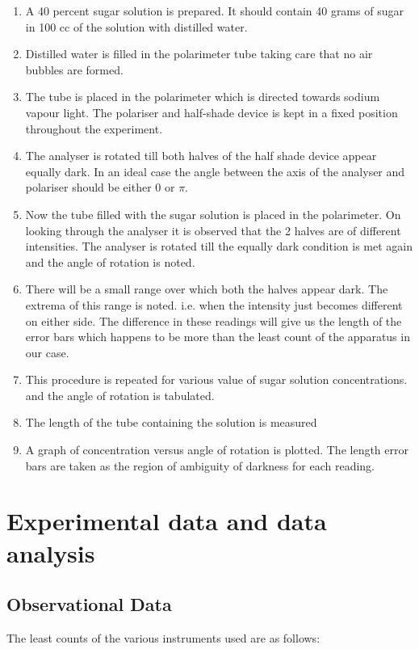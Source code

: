 \documentclass{dkpinto-report}
\begin{document}
\begin{enumerate}
\item A 40 percent sugar solution is prepared. It should contain 40 grams of sugar in 100 cc of the solution with distilled water.
\item Distilled water is filled in the polarimeter tube taking care that no air bubbles are formed.
\item The tube is placed in the polarimeter which is directed towards sodium vapour light. The polariser and half-shade device is kept in a fixed position throughout the experiment.
\item The analyser is rotated till both halves of the half shade device appear equally dark. In an ideal case the angle between the axis of the analyser and polariser should be either 0 or $\pi$.
\item Now the tube filled with the sugar solution is placed in the polarimeter. On looking through the analyser it is observed that the 2 halves are of different intensities. The analyser is rotated till the equally dark condition is met again and the angle of rotation is noted.
\item There will be a small range over which both the halves appear dark. The extrema of this range is noted. i.e. when the intensity just becomes different on either side. The difference in these readings will give us the length of the error bars which happens to be more than the least count of the apparatus in our case.
\item This procedure is repeated for various value of sugar solution concentrations. and the angle of rotation is tabulated.
\item The length of the tube containing the solution is measured
\item A graph of concentration versus angle of rotation is plotted. The length error bars are taken as the region of ambiguity of darkness for each reading.
\end{enumerate}


\section{Experimental data and data analysis}

\subsection{Observational Data}
The least counts of the various instruments used are as follows:
\end{document}
